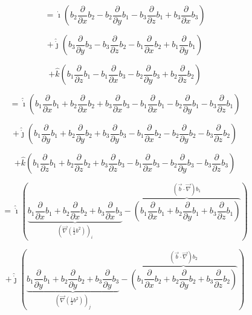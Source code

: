 \documentclass[12pt]{article}
\begin{document}
\[
    = \hat{\dot{\imath}}
    \left(
    b_{2} \frac{\partial}{\partial x} b_{2}
    - b_{2} \frac{\partial}{\partial y} b_{1}
    - b_{3} \frac{\partial}{\partial z} b_{1}
    + b_{3} \frac{\partial}{\partial x} b_{3}
    \right)
\]

\[
    + \hat{\dot{\jmath}}
    \left(
    b_{3} \frac{\partial}{\partial y} b_{3}
    - b_{3} \frac{\partial}{\partial z} b_{2}
    - b_{1} \frac{\partial}{\partial x} b_{2}
    + b_{1} \frac{\partial}{\partial y} b_{1}
    \right)
\]

\[
    + \hat{k}
    \left(
    b_{1} \frac{\partial}{\partial z} b_{1}
    - b_{1} \frac{\partial}{\partial x} b_{3}
    - b_{2} \frac{\partial}{\partial y} b_{3}
    + b_{2} \frac{\partial}{\partial z} b_{2}
    \right)
\]

\[
    = \hat{\dot{\imath}}
    \left(
    b_{1} \frac{\partial}{\partial x} b_{1}
    + b_{2} \frac{\partial}{\partial x} b_{2}
    + b_{3} \frac{\partial}{\partial x} b_{3}
    - b_{1} \frac{\partial}{\partial x} b_{1}
    - b_{2} \frac{\partial}{\partial y} b_{1}
    - b_{3} \frac{\partial}{\partial z} b_{1}
    \right)
\]

\[
    + \hat{\dot{\jmath}}
    \left(
    b_{1} \frac{\partial}{\partial y} b_{1}
    + b_{2} \frac{\partial}{\partial y} b_{2}
    + b_{3} \frac{\partial}{\partial y} b_{3}
    - b_{1} \frac{\partial}{\partial x} b_{2}
    - b_{2} \frac{\partial}{\partial y} b_{2}
    - b_{3} \frac{\partial}{\partial z} b_{2}
    \right)
\]

\[
    + \hat{k}
    \left(
    b_{1} \frac{\partial}{\partial z} b_{1}
    + b_{2} \frac{\partial}{\partial z} b_{2}
    + b_{3} \frac{\partial}{\partial z} b_{3}
    - b_{1} \frac{\partial}{\partial x} b_{3}
    - b_{2} \frac{\partial}{\partial y} b_{3}
    - b_{3} \frac{\partial}{\partial z} b_{3}
    \right)
\]

\[
    = \hat{\dot{\imath}}
    \left(
    \underbrace{b_{1} \frac{\partial}{\partial x} b_{1}
        + b_{2} \frac{\partial}{\partial x} b_{2}
        + b_{3} \frac{\partial}{\partial x} b_{3}}
    _{{\left(\vec{\nabla} \left(\frac{1}{2} b^2\right)\right)}_i}
    - \overbrace{\left(b_{1} \frac{\partial}{\partial x} b_{1}
        + b_{2} \frac{\partial}{\partial y} b_{1}
        + b_{3} \frac{\partial}{\partial z} b_{1}\right)}
    ^{(\vec{b} \cdot \vec{\nabla}) b_{1}}
    \right)
\]

\[
    + \hat{\dot{\jmath}}
    \left(
    \underbrace{b_{1} \frac{\partial}{\partial y} b_{1}
        + b_{2} \frac{\partial}{\partial y} b_{2}
        + b_{3} \frac{\partial}{\partial y} b_{3}}
    _{{\left(\vec{\nabla} \left(\frac{1}{2} b^2\right)\right)}_j}
    - \overbrace{\left(b_{1} \frac{\partial}{\partial x} b_{2}
        + b_{2} \frac{\partial}{\partial y} b_{2}
        + b_{3} \frac{\partial}{\partial z} b_{2}\right)}
    ^{(\vec{b} \cdot \vec{\nabla}) b_{2}}
    \right)
\]
\end{document}
